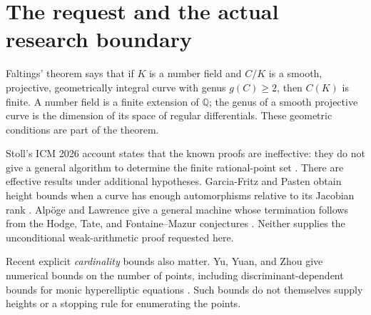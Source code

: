 \documentclass[11pt,letterpaper]{article}
\newcommand{\iPRA}{\mathsf{iPRA}}
\newcommand{\Q}{\mathbb Q}
\theoremstyle{definition}
\begin{document}
\begin{abstract}
The requested general proof cannot be supplied by the arguments established
here. Arbitrary-matrix intuitionistic witnessing turns a uniform $\iPRA$
proof of positive rational-point finiteness into a primitive recursive
height bound. We make this implication precise for squarefree monic
quintics, give all arithmetic predicates and an explicit enumeration, and
prove the equivalence of finite-list and height witnesses. Cardinality
bounds and double-negated finiteness are separated from this conclusion.
As an unconditional substantial instance, explicit finite descent proves
that the Fermat quartic has exactly four rational points. The accompanying
Lean files compile without holes or custom axioms; the audited results
have no dependence on \texttt{Classical.choice}. The report specifies
the remaining object-theory work and the unresolved general mathematical
step rather than placing that step inside an assumed lemma.
\end{abstract}
\setcounter{tocdepth}{1}
\tableofcontents
\newpage

\section{The request and the actual research boundary}
Faltings' theorem says that if $K$ is a number field and $C/K$ is a
smooth, projective, geometrically integral curve with genus $g(C)\geq2$,
then $C(K)$ is finite. A number field is a finite extension of $\Q$;
the genus of a smooth projective curve is the dimension of its space of
regular differentials. These geometric conditions are part of the theorem.

Stoll's ICM 2026 account states that the known proofs are ineffective:
they do not give a general algorithm to determine the finite rational-point
set \cite{Stoll}. There are effective results under additional hypotheses.
Garcia-Fritz and Pasten obtain height bounds when a curve has enough
automorphisms relative to its Jacobian rank \cite{GFP}.
Alp\"oge and Lawrence give a general machine whose termination follows
from the Hodge, Tate, and Fontaine--Mazur conjectures \cite{AL}.
Neither supplies the unconditional weak-arithmetic proof requested here.

Recent explicit \emph{cardinality} bounds also matter. Yu, Yuan, and
Zhou give numerical bounds on the number of points, including
discriminant-dependent bounds for monic hyperelliptic equations
\cite[Theorem 1.7]{YYZ}. Such bounds do not themselves supply heights
or a stopping rule for enumerating the points.
\end{document}
